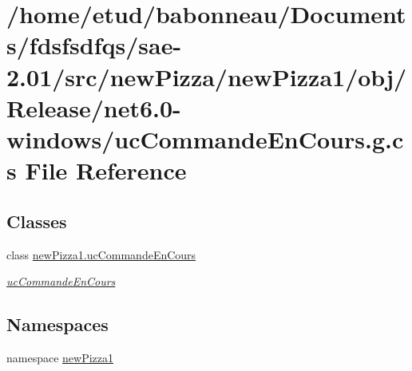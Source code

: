 \hypertarget{Release_2net6_80-windows_2ucCommandeEnCours_8g_8cs}{}\section{/home/etud/babonneau/\+Documents/fdsfsdfqs/sae-\/2.01/src/new\+Pizza/new\+Pizza1/obj/\+Release/net6.0-\/windows/uc\+Commande\+En\+Cours.g.\+cs File Reference}
\label{Release_2net6_80-windows_2ucCommandeEnCours_8g_8cs}
\subsection*{Classes}
\begin{DoxyCompactItemize}
\item 
class \hyperlink{classnewPizza1_1_1ucCommandeEnCours}{new\+Pizza1.\+uc\+Commande\+En\+Cours}
\begin{DoxyCompactList}\small\item\em \hyperlink{classnewPizza1_1_1ucCommandeEnCours}{uc\+Commande\+En\+Cours} \end{DoxyCompactList}\end{DoxyCompactItemize}
\subsection*{Namespaces}
\begin{DoxyCompactItemize}
\item 
namespace \hyperlink{namespacenewPizza1}{new\+Pizza1}
\end{DoxyCompactItemize}
